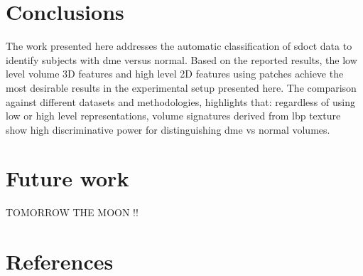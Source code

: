 \documentclass[review]{elsarticle}
\begin{document}
\maketitle

\acresetall  %
\begingroup  %
\let\clearpage\relax



\endgroup


\section{Conclusions}\label{sec:con}
The work presented here addresses the automatic classification of \ac{sdoct} data to identify subjects with \ac{dme} versus normal.
Based on the reported results, the low level volume 3D features and high level 2D features using patches achieve the most desirable results in the experimental setup presented here.
The comparison against different datasets and methodologies, highlights that:
regardless of using low or high level representations, volume signatures derived from \ac{lbp} texture show high discriminative power for distinguishing \ac{dme} vs normal volumes.

\section{Future work }
TOMORROW THE MOON !!



\section*{References}
\end{document}
